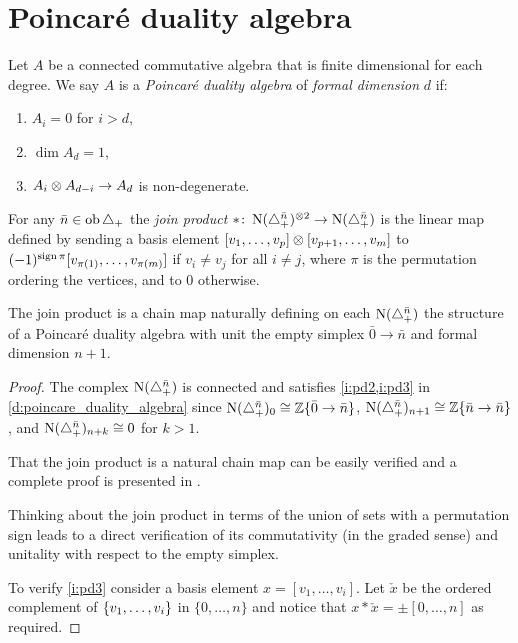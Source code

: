
\section{Poincar\'e duality algebra}\label{s:statement}

\begin{definition}\label{d:poincare_duality_algebra}
	Let $A$ be a connected commutative algebra that is finite dimensional for each degree.
	We say $A$ is a \textit{Poincar\'e duality algebra} of \textit{formal dimension} $d$ if:
	\begin{enumerate}
		\item\label{i:pd1} $A_i = 0$ for $i > d$,
		\item\label{i:pd2} $\dim A_d = 1$,
		\item\label{i:pd3} $A_i \otimes A_{d-i} \to A_d$ is non-degenerate.
	\end{enumerate}
\end{definition}

\begin{definition}\label{d:join_product}
	For any $\bar{n} \in \operatorname{ob}\triangle_{+}$ the \textit{join product} $\ast \colon \operatorname{N}(\triangle_{+}^{\bar{n}})^{\otimes 2} \to \operatorname{N}(\triangle_{+}^{\bar{n}})$ is the linear map defined by sending a basis element $[v_1, \dots, v_p] \otimes [v_{p+1},\dots,v_{m}]$ to $(-1)^{\operatorname{sign} \pi}[v_{\pi(1)}, \dots, v_{\pi(m)}]$	if $v_i \neq v_j$ for all $i \neq j$, where $\pi$ is the permutation ordering the vertices, and to $0$ otherwise.
\end{definition}

\begin{theorem}
	The join product is a chain map naturally defining on each $\operatorname{N}(\triangle_{+}^{\bar{n}})$ the structure of a Poincar\'e duality algebra with unit the empty simplex $\bar{0} \to \bar{n}$ and formal dimension $n+1$.
\end{theorem}

\begin{proof}
	The complex $\operatorname{N}(\triangle_{+}^{\bar{n}})$ is connected and satisfies \cref{i:pd2,i:pd3} in \cref{d:poincare_duality_algebra} since $\operatorname{N}(\triangle_{+}^{\bar{n}})_0 \cong \mathbb{Z}\{\bar{0} \to \bar{n}\}$, $\operatorname{N}(\triangle_{+}^{\bar{n}})_{n+1} \cong \mathbb{Z}\{\bar{n} \to \bar{n}\}$, and $\operatorname{N}(\triangle_{+}^{\bar{n}})_{n+k} \cong 0$ for $k>1$.

	That the join product is a natural chain map can be easily verified and a complete proof is presented in \cite[p.19]{medina2020prop1}.

	Thinking about the join product in terms of the union of sets with a permutation sign leads to a direct verification of its commutativity (in the graded sense) and unitality with respect to the empty simplex.

	To verify \cref{i:pd3} consider a basis element $x = [v_1,\dots,v_i]$.
	Let $\check{x}$ be the ordered complement of $\{v_1,\dots,v_i\}$ in $\{0,\dots,n\}$ and notice that $x \ast \check{x} = \pm [0,\dots,n]$ as required.
\end{proof}

